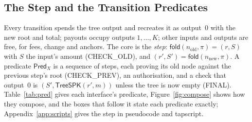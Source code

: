 \documentclass[runningheads]{llncs}
\newif\iffullversion
\newcommand{\TreeSpk}{\ensuremath{\mathsf{TreeSPK}}}
\newcommand{\fold}{\ensuremath{\mathsf{fold}}}
\newcommand{\tr}[1]{\textsf{#1}}
\newcommand{\Pred}{\ensuremath{\mathsf{Pred}}}
\begin{document}


\iffullversion
\subsection{The Step and the Transition Predicates}\label{sec:transitions}

Every transition spends the tree output and recreates it as output~0
with the new root and total; payouts occupy outputs $1, \dots, K$; other
inputs and outputs are free, for fees, change and anchors. The core is
the \emph{step}: $\fold(n_{\mathrm{old}}, \pi) = (r, S)$ with $S$ the
input's amount (\tr{CHECK\_OLD}), and $(r', S') = \fold(n_{\mathrm{new}},
\pi)$. A predicate $\Pred_X$ is a sequence of steps, each proving its old
node against the previous step's root (\tr{CHECK\_PREV}), an
authorisation, and a check that output~0 is $(S', \TreeSpk(r', m))$
unless the tree is now empty (\tr{FINAL}). Table~\ref{tab:pred} gives
each interface's predicate, Figure~\ref{fig:compose} shows how they
compose, and the boxes that follow it state each predicate exactly;
Appendix~\ref{app:scripts} gives the step in pseudocode and tapscript.


\end{document}
